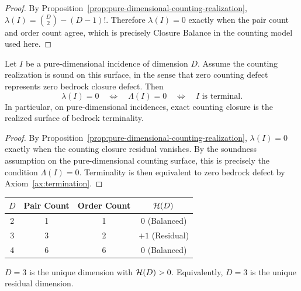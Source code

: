 \begin{proof}
By Proposition~\ref{prop:pure-dimensional-counting-realization},
\(\lambda(I)=\binom{D}{2}-(D-1)!\). Therefore \(\lambda(I)=0\) exactly when
the pair count and order count agree, which is precisely Closure Balance in
the counting model used here.
\end{proof}

\begin{proposition}
\label{prop:counting-realization-reflects-terminality}
Let \(I\) be a pure-dimensional incidence of dimension \(D\). Assume the
counting realization is sound on this surface, in the sense that zero counting
defect represents zero bedrock closure defect. Then
\[
\lambda(I)=0
\quad\Longleftrightarrow\quad
\Lambda(I)=0
\quad\Longleftrightarrow\quad
I\text{ is terminal.}
\]
In particular, on pure-dimensional incidences, exact counting closure is the
realized surface of bedrock terminality.
\end{proposition}

\begin{proof}
By Proposition~\ref{prop:pure-dimensional-counting-realization},
\(\lambda(I)=0\) exactly when the counting closure residual vanishes. By the
soundness assumption on the pure-dimensional counting surface, this is
precisely the condition \(\Lambda(I)=0\). Terminality is then equivalent to
zero bedrock defect by Axiom~\ref{ax:termination}.
\end{proof}

\begin{center}
\begin{tabular}{cccc}
\toprule
$D$ & Pair Count & Order Count & $\mathcal{H}(D)$ \\
\midrule
2 & 1 & 1 & 0 (Balanced) \\
3 & 3 & 2 & $+1$ (Residual) \\
4 & 6 & 6 & 0 (Balanced) \\
\bottomrule
\end{tabular}
\end{center}

\begin{theorem}\label{thm:barrier-uniqueness}
$D = 3$ is the unique dimension with $\mathcal{H}(D) > 0$.
Equivalently, $D=3$ is the unique residual dimension.
\end{theorem}

